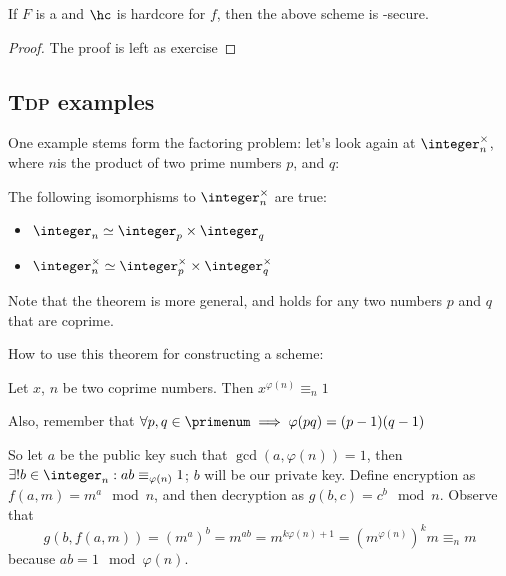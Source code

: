 \begin{theorem}
    If $F$ is a \tdp{} and $\hc$ is hardcore for $f$, then the above scheme is \cpa-secure.    
\end{theorem}

\begin{proof} The proof is left as exercise
\end{proof}

\subsection{\textsc{Tdp} examples}

One example stems form the factoring problem: let's look again at $\integer_n^\times$, where $n$is the product of two prime numbers $p$, and $q$:

\begin{theorem}
    The following isomorphisms to $\integer_n^\times$ are true:

    \begin{itemize}
        \item $\integer_n \simeq \integer_p \times \integer_q$
        \item $\integer_n^\times \simeq \integer_p^\times \times \integer_q^\times$
    \end{itemize}

    Note that the theorem is more general, and holds for any two numbers $p$ and $q$ that are coprime.
\end{theorem}

How to use this theorem for constructing a \pke{} scheme:

\begin{theorem}
    Let $x$, $n$ be two coprime numbers. Then $x^{\varphi(n)} \equiv_n 1$
\end{theorem}

Also, remember that $\forall p, q \in \primenum \implies \varphi(pq) = (p - 1)(q - 1)$

So let $a$ be the public key such that $\gcd(a, \varphi(n)) = 1$, then $\exists! b \in \integer_n : ab \equiv_{\varphi(n)} 1$; $b$ will be our private key. Define encryption as $f(a, m) = m^a \mod n$, and then decryption as $g(b, c) = c^b \mod n$. Observe that 
\[
    g(b, f(a, m)) = (m^a)^b = m^{ab} = m^{k \varphi(n) + 1} = (m^{\varphi(n)})^k m \equiv_n m
\]
because $ab = 1 \mod \varphi(n)$.

